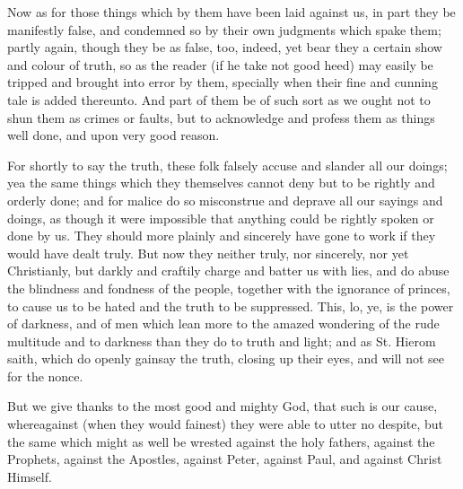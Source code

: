 Now as for those things which by them have been laid against us,
in part they be manifestly false, and condemned so by their own judgments
which spake them; partly again, though they be as false, too, indeed,
yet bear they a certain show and colour of truth, so as the reader (if
he take not good heed) may easily be tripped and brought into error
by them, specially when their fine and cunning tale
is added thereunto. And part of them be of such sort as we ought
not to shun them as crimes or faults, but to acknowledge and profess
them as things well done, and upon very good reason.

For shortly to say the truth, these folk falsely accuse and slander
all our doings; yea the same things which they themselves cannot deny
but to be rightly and orderly done; and for malice do so misconstrue
and deprave all our sayings and doings, as though it were impossible
that anything could be rightly spoken or done by us. They should
more plainly and sincerely have gone to work if they would have dealt
truly. But now they neither truly, nor sincerely, nor yet Christianly,
but darkly and craftily charge and batter us with lies, and do abuse
the blindness and fondness of the people, together with the ignorance
of princes, to cause us to be hated and the truth to be suppressed.
This, lo, ye, is the power of darkness, and of men which lean more to
the amazed wondering of the rude multitude and to darkness than they
do to truth and light; and as St. Hierom saith, which do openly gainsay
the truth, closing up their eyes, and will not see for the nonce.

But we give thanks to the most good and mighty God, that such is
our cause, whereagainst (when they would fainest) they were able to
utter no despite,
but the same which might as well be wrested against the holy fathers,
against the Prophets, against the Apostles, against Peter, against Paul,
and against Christ Himself.

